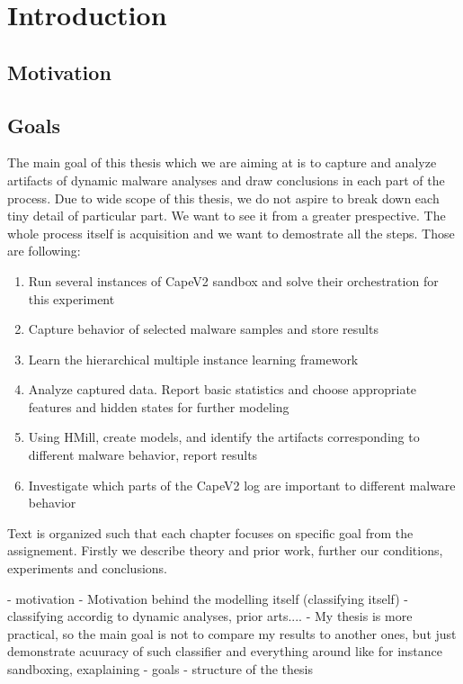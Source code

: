 \chapter{Introduction}
\section{Motivation}
\section{Goals}
The main goal of this thesis which we are aiming at is to capture and analyze artifacts of dynamic malware analyses and draw conclusions in each part of the process. Due to wide scope of this thesis, we do not aspire to break down each tiny detail of particular part. We want to see it from a greater prespective. The whole process itself is acquisition and we want to demostrate all the steps. Those are following:

\begin{enumerate}
    \item Run several instances of CapeV2 \cite{Cape} sandbox and solve their orchestration for this experiment
    \item Capture behavior of selected malware samples and store results
    \item Learn the hierarchical multiple instance learning framework
    \item Analyze captured data. Report basic statistics and choose appropriate features and hidden states for further modeling
    \item Using HMill, create models, and identify the artifacts corresponding to different malware behavior, report results
    \item Investigate which parts of the CapeV2 log are important to different malware behavior
\end{enumerate}

Text is organized such that each chapter focuses on specific goal from the assignement. Firstly we describe theory and prior work, further our conditions, experiments and conclusions.


- motivation
- Motivation behind the modelling itself (classifying itself)
  - classifying accordig to dynamic analyses, prior arts....
  - My thesis is more practical, so the main goal is not to compare my results to another ones, but just demonstrate acuuracy of such classifier and everything around like for instance sandboxing, exaplaining
- goals
- structure of the thesis
